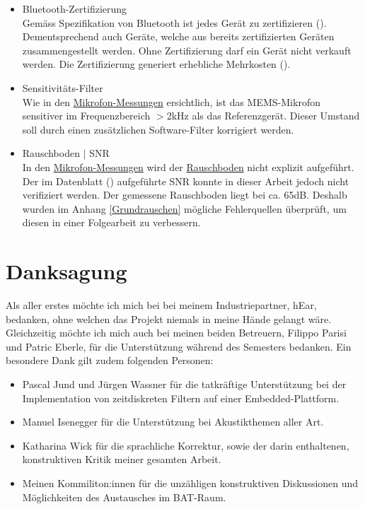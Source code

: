 \documentclass[12pt]{article}
\begin{document}
\begin{itemize}
		\item Bluetooth-Zertifizierung\\
		Gemäss Spezifikation von Bluetooth ist jedes Gerät zu zertifizieren (\cite{noauthor_bluetooth_nodate-1}). Dementsprechend auch Geräte, welche aus bereits zertifizierten Geräten zusammengestellt werden. Ohne Zertifizierung darf ein Gerät nicht verkauft werden. Die Zertifizierung generiert erhebliche Mehrkosten (\cite{noauthor_bluetooth_nodate}).
		\item Sensitivitäts-Filter \\
		Wie in den \hyperref[Mikrofon-Messungen]{Mikrofon-Messungen} ersichtlich, ist das MEMS-Mikrofon sensitiver im Frequenzbereich $>$2kHz als das Referenzgerät. Dieser Umstand soll durch einen zusätzlichen Software-Filter korrigiert werden.
		\item Rauschboden $\vert$ SNR \\
		In den \hyperref[Mikrofon-Messungen]{Mikrofon-Messungen} wird der \hyperref[Rauschboden]{Rauschboden} nicht explizit auf\-geführt. Der im Datenblatt (\cite{noauthor_httpsinvensensetdkcomwp-contentuploads202007ds-000157-ics-41351-v14pdf_nodate}) aufgeführte SNR konnte in dieser Arbeit jedoch nicht verifiziert werden. Der gemessene Rauschboden liegt bei ca. 65dB. Deshalb wurden im Anhang \ref{Grundrauschen} mögliche Fehlerquellen überprüft, um diesen in einer Folgearbeit zu verbessern.
	\end{itemize}
	
	\newpage
	\section*{Danksagung}
	Als aller erstes möchte ich mich bei bei meinem Industriepartner, hEar, bedanken, ohne welchen das Projekt niemals in meine Hände gelangt wäre. Gleichzeitig möchte ich mich auch bei meinen beiden Betreuern, Filippo Parisi und Patric Eberle, für die Unterstützung während des Semesters bedanken. Ein besondere Dank gilt zudem folgenden Personen:
	\begin{itemize}
		\item Pascal Jund und Jürgen Wassner für die tatkräftige Unterstützung bei der Implementation von zeitdiskreten Filtern auf einer Embedded-Plattform.
		\item Manuel Isenegger für die Unterstützung bei Akustikthemen aller Art.
		\item Katharina Wick für die sprachliche Korrektur, sowie der darin enthaltenen, konstruktiven Kritik meiner gesamten Arbeit.
		\item Meinen Kommiliton:innen für die unzähligen konstruktiven Diskussionen und Möglichkeiten des Austausches im BAT-Raum. 
	\end{itemize}
	
\end{document}
